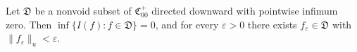 Let $\mathfrak{D}$ be a nonvoid subset of $\mathfrak{C}_{00}^+$ directed downward with pointwise infimum zero. Then $\inf\{I(f) : f \in \mathfrak{D}\} = 0$, and for every $\varepsilon > 0$ there exists $f_{\varepsilon} \in \mathfrak{D}$ with $\|f_{\varepsilon}\|_u < \varepsilon$.
